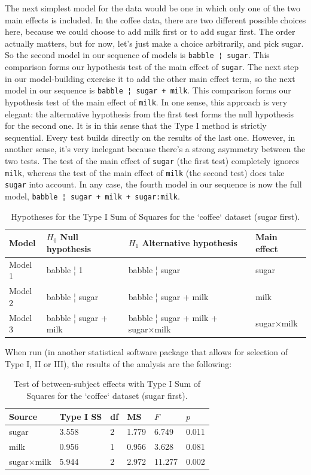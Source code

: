 \documentclass[
  11pt,
  a4paper,
  twoside,symmetric,openright]{book}
\theoremstyle{break}
\theoremstyle{break}
\begin{document}
The next simplest model for the data would be one in which only one of the two main effects is included. In the coffee data, there are two different possible choices here, because we could choose to add milk first or to add sugar first. The order actually matters, but for now, let's just make a choice arbitrarily, and pick sugar. So the second model in our sequence of models is \texttt{babble\ ¦\ sugar}. This comparison forms our hypothesis test of the main effect of \texttt{sugar}. The next step in our model-building exercise it to add the other main effect term, so the next model in our sequence is \texttt{babble\ ¦\ sugar\ +\ milk}. This comparison forms our hypothesis test of the main effect of \texttt{milk}. In one sense, this approach is very elegant: the alternative hypothesis from the first test forms the null hypothesis for the second one. It is in this sense that the Type I method is strictly sequential. Every test builds directly on the results of the last one. However, in another sense, it's very inelegant because there's a strong asymmetry between the two tests. The test of the main effect of \texttt{sugar} (the first test) completely ignores \texttt{milk}, whereas the test of the main effect of \texttt{milk} (the second test) does take \texttt{sugar} into account. In any case, the fourth model in our sequence is now the full model, \texttt{babble\ ¦\ sugar\ +\ milk\ +\ sugar:milk}.

\begin{table}[!h]

\caption{\label{tab:unnamed-chunk-92}Hypotheses for the Type I Sum of Squares for the `coffee` dataset (sugar first).}
\centering
\begin{tabular}[t]{llll}
\toprule
Model & $H_0$ Null hypothesis & $H_1$ Alternative hypothesis & Main effect\\
\midrule
Model 1 & babble ¦ 1 & babble ¦ sugar & sugar\\
Model 2 & babble ¦ sugar & babble ¦ sugar + milk & milk\\
Model 3 & babble ¦ sugar + milk & babble ¦ sugar + milk + sugar×milk & sugar×milk\\
\bottomrule
\end{tabular}
\end{table}

When run (in another statistical software package that allows for selection of Type I, II or III), the results of the analysis are the following:

\begin{table}[!h]

\caption{\label{tab:unnamed-chunk-93}Test of between-subject effects with Type I Sum of Squares for the `coffee` dataset (sugar first).}
\centering
\begin{tabular}[t]{llllll}
\toprule
Source & Type I SS & df & MS & $F$ & $p$\\
\midrule
sugar & 3.558 & 2 & 1.779 & 6.749 & 0.011\\
milk & 0.956 & 1 & 0.956 & 3.628 & 0.081\\
sugar×milk & 5.944 & 2 & 2.972 & 11.277 & 0.002\\
\bottomrule
\end{tabular}
\end{table}
\end{document}
